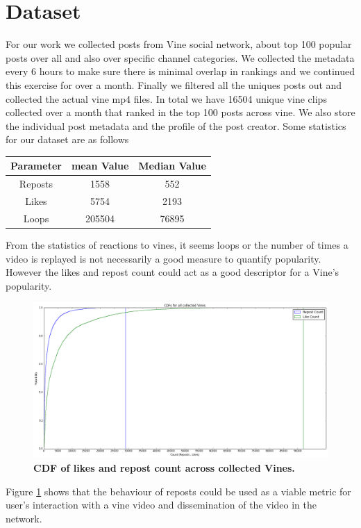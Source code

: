\section{Dataset}
For our work we collected posts from Vine social network, about top 100 popular posts over all and also over specific channel categories. We collected the metadata every 6 hours to make sure there is minimal overlap in rankings and we continued this exercise for over a month. Finally we filtered all the uniques posts out and collected the actual vine mp4 files. In total we have 16504 unique vine clips collected over a month that ranked in the top 100 posts across vine. We also store the individual post metadata and the profile of the post creator. Some statistics for our dataset are as follows 
\par
\begin{center}
\begin{tabular}{ |c|c|c| } 
 \hline
 Parameter & mean Value & Median Value \\ 
 \hline
 Reposts & 1558 & 552 \\ 
 Likes & 5754 & 2193 \\ 
 Loops & 205504 & 76895 \\ 
 \hline
\end{tabular}
\end{center}
\par
From the statistics of reactions to vines, it seems loops or the number of times a video is replayed is not necessarily a good measure to quantify popularity. However the likes and repost count could act as a good descriptor for a Vine's popularity. 

\begin{figure}
\centering
\includegraphics[width=\columnwidth]{plots/Like_repost_CDF}
\caption{\textbf{CDF of likes and repost count across collected Vines.}}
\label{fig:Like_Repost_CDF}
\end{figure}

Figure \ref{fig:Like_Repost_CDF} shows that the behaviour of reposts could be used as a viable metric for user's interaction with a vine video and dissemination of the video in the network. 